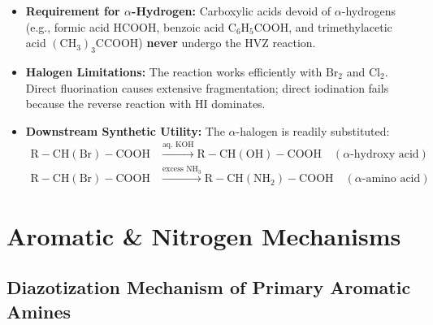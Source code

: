 \documentclass[10pt,a4paper]{article}
\begin{document}
\begin{trapbox}
\begin{itemize}
  \item \textbf{Requirement for $\alpha$-Hydrogen:} Carboxylic acids devoid of $\alpha$-hydrogens (e.g., formic acid $\mathrm{HCOOH}$, benzoic acid $\mathrm{C_6H_5COOH}$, and trimethylacetic acid $\mathrm{(CH_3)_3CCOOH}$) \textbf{never} undergo the HVZ reaction.
  \item \textbf{Halogen Limitations:} The reaction works efficiently with $\mathrm{Br_2}$ and $\mathrm{Cl_2}$. Direct fluorination causes extensive fragmentation; direct iodination fails because the reverse reaction with $\mathrm{HI}$ dominates.
  \item \textbf{Downstream Synthetic Utility:} The $\alpha$-halogen is readily substituted:
  \begin{align*}
    \mathrm{R-CH(Br)-COOH} &\xrightarrow{\text{aq. } \mathrm{KOH}} \mathrm{R-CH(OH)-COOH} \quad (\alpha\text{-hydroxy acid})\\
    \mathrm{R-CH(Br)-COOH} &\xrightarrow{\text{excess } \mathrm{NH_3}} \mathrm{R-CH(NH_2)-COOH} \quad (\alpha\text{-amino acid})
  \end{align*}
\end{itemize}
\end{trapbox}

\newpage
\section{Aromatic \& Nitrogen Mechanisms}

\subsection{Diazotization Mechanism of Primary Aromatic Amines}
\end{document}
